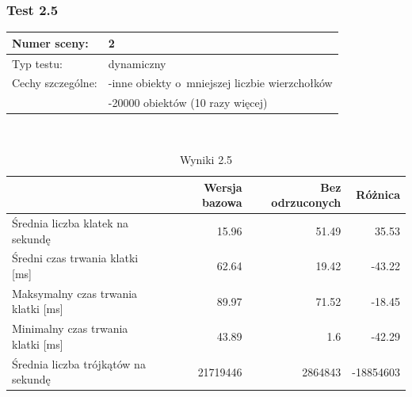 \documentclass[a4paper,twoside,12pt]{book}
\begin{document}
\vbox{}

\subsubsection{Test 2.5}
\begin{tabular}{|l||l|}
\hline
Numer sceny: & 2 \\
\hline
Typ testu: & dynamiczny \\
\hline
Cechy szczególne: & -inne obiekty o~mniejszej liczbie wierzchołków \\
& -20000 obiektów (10 razy więcej) \\
\hline
\end{tabular}\\

\vbox{}

\begin{table}[H]
    \centering
    \caption{Wyniki 2.5}
    \label{tab:frustrum_test5}
    \begin{tabular}{|l||r|r|r|}
        \hline
        & Wersja bazowa & Bez odrzuconych & Różnica \\
        \hline
        Średnia liczba klatek na sekundę & 15.96 & 51.49 & 35.53 \\
        \hline
        Średni czas trwania klatki [ms] & 62.64 & 19.42 & -43.22 \\
        \hline
        Maksymalny czas trwania klatki [ms] & 89.97 & 71.52 & -18.45 \\
        \hline
        Minimalny czas trwania klatki [ms] & 43.89 & 1.6 & -42.29 \\
        \hline
        Średnia liczba trójkątów na sekundę & 21719446 & 2864843 & -18854603 \\
        \hline
    \end{tabular}
\end{table}

\vbox{}
\end{document}
